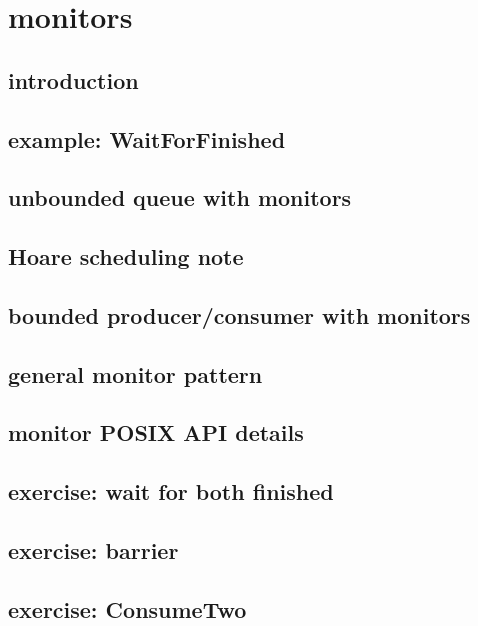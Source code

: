 
\section{monitors}

\subsection{introduction}

\subsection{example: WaitForFinished}


\subsection{unbounded queue with monitors}


\subsection{Hoare scheduling note}


\subsection{bounded producer/consumer with monitors}
 

\subsection{general monitor pattern}


\subsection{monitor POSIX API details}


\subsection{exercise: wait for both finished}


\subsection{exercise: barrier}


\subsection{exercise: ConsumeTwo}


